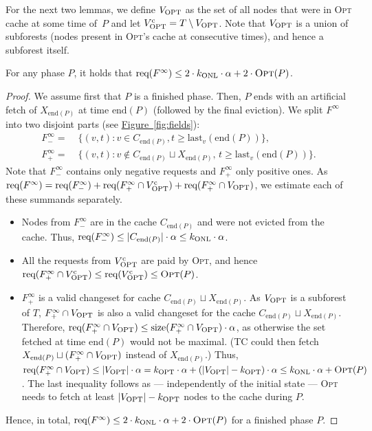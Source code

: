 \documentclass[sigconf,screen=true]{acmart}
\newcommand{\lref}[2][]{\hyperref[#2]{#1~\ref*{#2}}}
\newcommand{\ALG}{\textsc{TC}\xspace}
\newcommand{\OPT}{\textsc{Opt}\xspace}
\newcommand{\last}{\textrm{last}}
\newcommand{\size}{\textrm{size}}
\newcommand{\req}{\textrm{req}}
\newcommand{\enP}{\textrm{end}(P)}
\newcommand{\kALG}{k_\textnormal{ONL}}
\newcommand{\kOPT}{k_\textnormal{OPT}}
\newcommand{\VOPT}{V_\textnormal{OPT}}
\newcommand{\VOPTC}{V_\textnormal{OPT}^\textrm{c}}
\begin{document}
For the next two lemmas, we define $\VOPT$ as the set of all nodes that were
in \OPT cache at some time of~$P$ and let $\VOPTC = T \setminus \VOPT$. Note
that $\VOPT$ is a union of subforests (nodes present in \OPT's cache at
consecutive times), and hence a subforest itself.

\begin{lemma}
\label{lem:f_infty}
For any phase $P$, it holds that $\req (F^\infty) \leq 2 \cdot \kALG \cdot
\alpha + 2 \cdot \OPT(P)$.
\end{lemma}

\begin{proof}
We assume first that $P$ is a finished phase. Then, $P$ ends with an
artificial fetch of $X_{\enP}$ at time $\enP$ (followed by the final eviction).
We split $F^\infty$ into two disjoint parts (see \lref[Figure]{fig:fields}):
\begin{align*}
  F^\infty_- = &\; \{(v, t): v \in C_{\enP}, t \geq \last_v(\enP)\}, \\
  F^\infty_+ = &\; \{(v, t): v \notin C_{\enP} \sqcup X_{\enP}, \,
           t \geq \last_v(\enP)\}.
\end{align*}
Note that $F^\infty_-$ contains only negative requests and $F^\infty_+$ only
positive ones. As $\req(F^\infty) = \req(F^\infty_-) + \req (F^\infty_+ \cap
\VOPTC) + \req (F^\infty_+ \cap \VOPT)$, we estimate each of these summands
separately.
\begin{itemize}
\item
Nodes from $F^\infty_-$ are in the cache $C_{\enP}$ and were not
evicted from the cache. Thus, $\req(F^{\infty}_-) \leq |C_{\enP}| \cdot \alpha
\leq \kALG \cdot \alpha$.
\item
All the requests from $\VOPTC$ are paid by \OPT, and hence
$\req(F^\infty_+ \cap \VOPTC) \leq \req(\VOPTC) \leq \OPT(P)$.
\item
$F^\infty_+$ is a valid changeset for cache $C_{\enP} \sqcup X_{\enP}$.
As $\VOPT$ is a subforest of $T$, $F^\infty_+ \cap \VOPT$ is also a valid
changeset for the cache $C_{\enP} \sqcup X_{\enP}$. Therefore, $\req
(F^\infty_+ \cap \VOPT) \leq \size(F^\infty_+ \cap \VOPT) \cdot \alpha$, as
otherwise the set fetched at time $\enP$ would not be maximal. (\ALG could
then fetch $X_{\enP} \sqcup (F^\infty_+ \cap \VOPT)$ instead of $X_{\enP}$.)
Thus, $\req (F^\infty_+ \cap \VOPT) \leq |\VOPT| \cdot \alpha = \kOPT \cdot
\alpha + (|\VOPT| - \kOPT)
\cdot \alpha \leq \kALG \cdot \alpha + \OPT(P)$.
The last inequality follows as --- independently of the initial state --- \OPT
needs to fetch at least $|\VOPT| - \kOPT$ nodes to the cache during $P$.
\end{itemize}
Hence, in total, $\req (F^\infty) \leq 2 \cdot \kALG \cdot
\alpha + 2 \cdot \OPT(P)$ for a finished phase $P$.


\end{proof}
\end{document}
